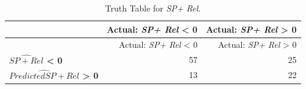 \documentclass[
  12pt]{article}
\begin{document}
\begin{longtable}[]{@{}lrr@{}}
\caption{Truth Table for \emph{SP+
Rel}.}\label{tbl-truth}\tabularnewline
\toprule\noalign{}
& Actual: \emph{SP+ Rel} \textless{} 0 & Actual: \emph{SP+ Rel}
\textgreater{} 0 \\
\midrule\noalign{}
\endfirsthead
\toprule\noalign{}
& Actual: \emph{SP+ Rel} \textless{} 0 & Actual: \emph{SP+ Rel}
\textgreater{} 0 \\
\midrule\noalign{}
\endhead
\bottomrule\noalign{}
\endlastfoot
\textbf{\(\widehat{SP+ Rel}\) \textless{} 0} & 57 & 25 \\
\textbf{\(\widehat{Predicted SP+ Rel}\) \textgreater{} 0} & 13 & 22 \\
\end{longtable}



\end{document}
